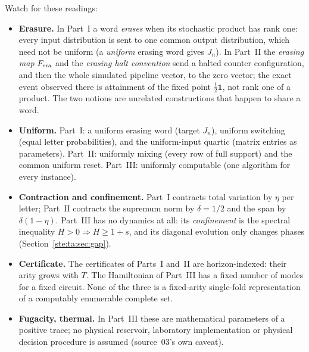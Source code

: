 \documentclass[11pt,letterpaper]{article}
\theoremstyle{definition}
\theoremstyle{remark}
\newcommand{\one}{\mathbf 1}
\begin{document}
Watch for these readings:
\begin{itemize}
\item \textbf{Erasure.} In Part~I a word \emph{erases} when its stochastic product has rank one: every input distribution is sent to one common output distribution, which need not be uniform (a \emph{uniform} erasing word gives $J_n$). In Part~II the \emph{erasing map} $F_{\rm era}$ and the \emph{erasing halt convention} send a halted counter configuration, and then the whole simulated pipeline vector, to the zero vector; the exact event observed there is attainment of the fixed point $\tfrac12\one$, not rank one of a product. The two notions are unrelated constructions that happen to share a word.
\item \textbf{Uniform.} Part~I: a uniform erasing word (target $J_n$), uniform switching (equal letter probabilities), and the uniform-input quartic (matrix entries as parameters). Part~II: uniformly mixing (every row of full support) and the common uniform reset. Part~III: uniformly computable (one algorithm for every instance).
\item \textbf{Contraction and confinement.} Part~I contracts total variation by $\eta$ per letter; Part~II contracts the supremum norm by $\delta=1/2$ and the span by $\delta(1-\eta)$. Part~III has no dynamics at all: its \emph{confinement} is the spectral inequality $H>0\Rightarrow H\ge1+s$, and its diagonal evolution only changes phases (Section~\ref{ste:ta:sec:gap}).
\item \textbf{Certificate.} The certificates of Parts~I and~II are horizon-indexed: their arity grows with $T$. The Hamiltonian of Part~III has a fixed number of modes for a fixed circuit. None of the three is a fixed-arity single-fold representation of a computably enumerable complete set.
\item \textbf{Fugacity, thermal.} In Part~III these are mathematical parameters of a positive trace; no physical reservoir, laboratory implementation or physical decision procedure is assumed (source~03's own caveat).
\end{itemize}
\end{document}
